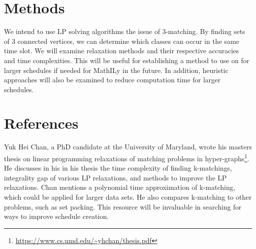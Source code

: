 \documentclass[11pt]{article}
\begin{document}
\section{Methods}

We intend to use LP solving algorithms the issue of 3-matching. By finding sets of 3 connected vertices, we can determine which classes can occur in the same time slot. We will examine relaxation methods and their respective accuracies and time complexities. This will be useful for establishing a method to use on for larger schedules if needed for MathILy in the future. In addition, heuristic approaches will also be examined to reduce computation time for larger schedules.


\section{References}
Yuk Hei Chan, a PhD candidate at the University of Maryland, wrote his masters thesis on linear programming relaxations of matching problems in hyper-graphs\footnote{\url{https://www.cs.umd.edu/~yhchan/thesis.pdf}}. He discusses in his in his thesis the time complexity of finding k-matchings, integrality gap of various LP relaxations, and methods to improve the LP relaxations. Chan mentions a polynomial time approximation of k-matching, which could be applied for larger data sets. He also compares k-matching to other problems, such as set packing. This resource will be invaluable in searching for ways to improve schedule creation.
\end{document}
